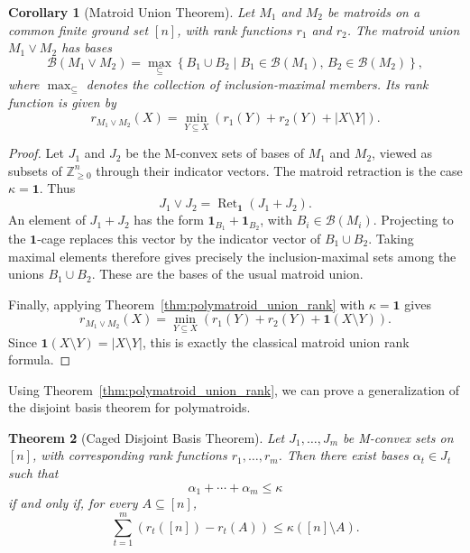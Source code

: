 \documentclass[10pt,a4paper]{amsart}
\newtheorem{theorem}{Theorem}[section]
\newtheorem{corollary}[theorem]{Corollary}
\newcommand{\ones}{\textbf{1}}
\DeclareMathOperator{\Ret}{Ret}                %
\begin{document}
\begin{corollary}[Matroid Union Theorem]\label{corr:matroid_union}
    Let $M_1$ and $M_2$ be matroids on a common finite ground set $[n]$,
    with rank functions $r_1$ and $r_2$. The matroid union $M_1\vee M_2$
    has bases
    \[
        \mathcal{B}(M_1\vee M_2)
        =
        \max_{\subseteq}
        \left\{
            B_1\cup B_2
            \mid
            B_1\in\mathcal{B}(M_1),\,
            B_2\in\mathcal{B}(M_2)
        \right\},
    \]
    where $\max_{\subseteq}$ denotes the collection of inclusion-maximal
    members. Its rank function is given by
    \[
        r_{M_1\vee M_2}(X)
        =
        \min_{Y\subseteq X}
        \left(
            r_1(Y)+r_2(Y)+|X\setminus Y|
        \right).
    \]
\end{corollary}

\begin{proof}
    Let $J_1$ and $J_2$ be the M-convex sets of bases of $M_1$ and $M_2$,
    viewed as subsets of $\mathbb{Z}_{\geq0}^n$ through their indicator
    vectors. The matroid retraction is the case $\kappa=\ones$. Thus
    \[
        J_1\vee J_2
        =
        \Ret_{\ones}(J_1+J_2).
    \]
    An element of $J_1+J_2$ has the form
    $\ones_{B_1}+\ones_{B_2}$, with
    $B_i\in\mathcal{B}(M_i)$. Projecting to the $\ones$-cage replaces
    this vector by the indicator vector of $B_1\cup B_2$. Taking maximal
    elements therefore gives precisely the inclusion-maximal sets among
    the unions $B_1\cup B_2$. These are the bases of the usual matroid
    union.

    Finally, applying Theorem~\ref{thm:polymatroid_union_rank} with
    $\kappa=\ones$ gives
    \[
        r_{M_1\vee M_2}(X)
        =
        \min_{Y\subseteq X}
        \left(
            r_1(Y)+r_2(Y)+\ones(X\setminus Y)
        \right).
    \]
    Since $\ones(X\setminus Y)=|X\setminus Y|$, this is exactly the
    classical matroid union rank formula.
\end{proof}
Using Theorem~\ref{thm:polymatroid_union_rank}, we can prove a generalization of the disjoint basis theorem for polymatroids.

\begin{theorem}[Caged Disjoint Basis Theorem]
\label{thm:caged_disjoint_basis}
    Let $J_1,\dots,J_m$ be M-convex sets on $[n]$, with corresponding rank
    functions $r_1,\dots,r_m$. Then there exist bases
    $\alpha_t\in J_t$ such that
    \[
        \alpha_1+\cdots+\alpha_m\leq\kappa
    \]
    if and only if, for every $A\subseteq[n]$,
    \[
        \sum_{t=1}^m
        \left(
            r_t([n])-r_t(A)
        \right)
        \leq
        \kappa([n]\setminus A).
    \]
\end{theorem}
\end{document}

